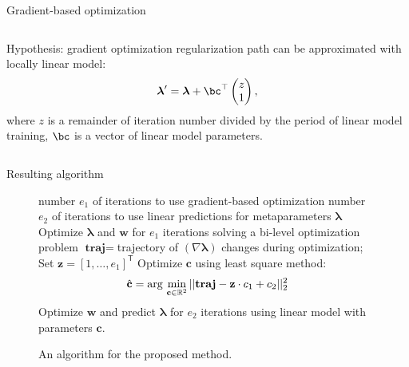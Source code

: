 \documentclass[12pt, aspectratio=169]{beamer}
\begin{document}
\begin{frame}{Gradient-based optimization}
\begin{columns}[c]
\fontsize{12}{10}\selectfont
{\color{red}Hypothesis}: gradient optimization regularization path can be approximated with locally linear model:
\fontsize{12}{10}\selectfont
$$\boldsymbol{\lambda}^\prime = 
     \boldsymbol{\lambda} + \bc^{\top}\begin{pmatrix}z\\1\end{pmatrix},$$
\fontsize{12}{10}\selectfont
where $z$ is a remainder of iteration number divided by the period of linear model training, $\bc$ is a vector of linear model parameters.
\end{columns}

\end{frame}

\begin{frame}{Resulting algorithm}
    \begin{figure}
\begin{algorithm}[H]
\caption{Metaparameter optimization}
 \begin{algorithmic}[1]

 \REQUIRE number $e_1$ of iterations to use gradient-based optimization 
 \REQUIRE number $e_2$ of iterations to use linear predictions for metaparameters $\boldsymbol{\lambda}$  
  \STATE Optimize $\boldsymbol{\lambda}$ and $\mathbf{w}$ for $e_1$ iterations solving a bi-level optimization problem
  \STATE $\textbf{traj} = $trajectory of $(\nabla \boldsymbol{\lambda})$ changes during optimization;
  \STATE Set $\mathbf{z} = [1,\dots,e_1]^\mathsf{T}$
  \STATE Optimize $\mathbf{c}$ using least square method: 
  $$\hat{\mathbf{c}} = \arg\,\min_{\mathbf{c} \in \mathbb{R}^2} ||\textbf{traj} - \mathbf{z}\cdot c_1 + c_2||_2^2$$
  \STATE Optimize $\mathbf{w}$ and predict $\boldsymbol{\lambda}$ for $e_2$ iterations using linear model with parameters $\mathbf{c}$.
  \ENDWHILE

 \end{algorithmic}
 \end{algorithm}
 \caption{An algorithm for the proposed method.}
 \label{algo}

 \end{figure}
\end{frame}
\end{document}
